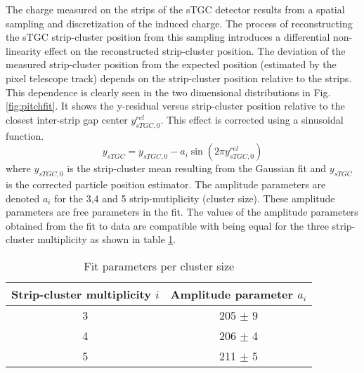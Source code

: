The charge measured on the strips of the sTGC detector results from a spatial sampling and discretization of the induced
charge. The process of reconstructing the sTGC strip-cluster position from this sampling introduces a differential
non-linearity effect on the reconstructed strip-cluster position. The deviation of the measured strip-cluster position
from the expected position (estimated by the pixel telescope track) depends on the strip-cluster position relative to
the strips.
This dependence is clearly seen in the two dimensional distributions in Fig.\ref{fig:pitchfit}. It shows the y-residual versus
strip-cluster position relative to the closest inter-strip gap center $y_{sTGC,0}^{rel}$. This effect is corrected using
a sinusoidal function.
\begin{equation}
 y_{sTGC} = y_{sTGC,0}-a_i\sin \left(2\pi y_{sTGC,0}^{rel}\right)
\end{equation}
where $y_{sTGC,0}$ is the strip-cluster mean resulting from the Gaussian fit and $y_{sTGC}$ is the corrected particle
position estimator. The amplitude parameters are denoted $a_i$ for the 3,4 and 5 strip-mutiplicity (cluster size). These
amplitude parameters are free parameters in the fit. The values of the amplitude parameters obtained from the fit to
data are compatible with being equal for the three strip-cluster multiplicity as shown in table \ref{table}.\par

\begin{table}
	\centering
	\caption{Fit parameters per cluster size}\label{table}
	\begin{tabular}{cc}
	\hline
	Strip-cluster multiplicity $i$ & Amplitude parameter $a_i$\\
	\hline
	3 & 205 $\pm$ 9\\
	4 & 206 $\pm$ 4\\
	5 & 211 $\pm$ 5\\
	\hline
	\end{tabular}
\end{table}

